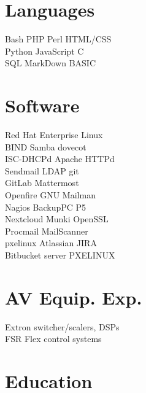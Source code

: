 \documentclass[letterpaper]{deedy-resume}
\begin{document}



\begin{minipage}[t]{0.27\textwidth}
\section{Languages}
Bash \textbullet{} PHP \textbullet{} Perl \textbullet{} HTML/CSS \\
Python \textbullet{} JavaScript \textbullet{} C \\
SQL \textbullet{} MarkDown \textbullet{} BASIC

\sectionspace
\section{Software}
Red Hat Enterprise Linux \\
BIND \textbullet{} Samba \textbullet{} dovecot \\
ISC-DHCPd \textbullet{} Apache HTTPd \\
Sendmail \textbullet{} LDAP \textbullet{} git \\
GitLab \textbullet{}  Mattermost \\
Openfire \textbullet{} GNU Mailman \\
Nagios \textbullet{} BackupPC \textbullet{} P5 \\
Nextcloud \textbullet{} Munki \textbullet{} OpenSSL \\
Procmail \textbullet{} MailScanner \\
pxelinux \textbullet{} Atlassian JIRA \\
Bitbucket server \textbullet{} PXELINUX

\sectionspace

\section{AV Equip. Exp.}
Extron switcher/scalers, DSPs \\
FSR Flex control systems

\sectionspace

\section{Education}

\end{minipage}
\end{document}
